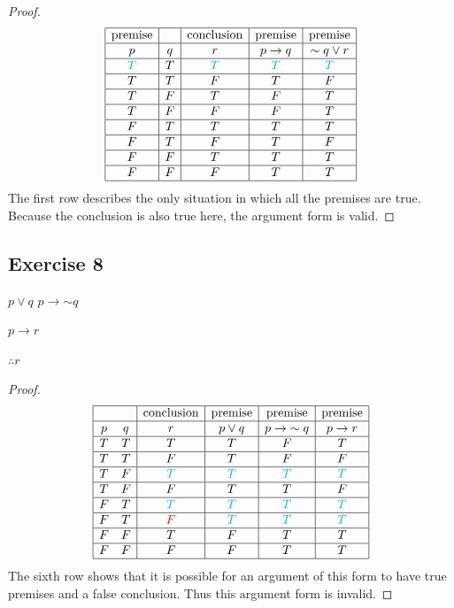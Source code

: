 \documentclass[14pt]{extarticle}
\begin{document}
\begin{proof} $$ \begin{array}{|c|c|c|c|c|} \hline \text{premise} & &
\text{conclusion} & \text{premise} & \text{premise} \\ \hline p & q & r & p \to
q & {\sim q} \vee r \\ \hline \color{cyan} T & T & \color{cyan} T & \color{cyan}
T & \color{cyan} T \\ \hline T & T & F & T & F \\ \hline T & F & T & F & T \\
\hline T & F & F & F & T \\ \hline F & T & T & T & T \\ \hline F & T & F & T & F
\\ \hline F & F & T & T & T \\ \hline F & F & F & T & T \\ \hline \end{array} $$
The first row describes the only situation in which all the premises are true.
Because the conclusion is also true here, the argument form is valid.
\end{proof}

\subsection{Exercise 8} $p \vee q$
$p \to {\sim q}$

$p \to r$

$\therefore r$

\begin{proof} $$ \begin{array}{|cc|c|c|c|c|} \hline & & \text{conclusion} &
\text{premise} & \text{premise} & \text{premise} \\ \hline p & q & r & p \vee q
& p \to {\sim q} & p \to r \\ \hline T & T & T & T & F & T \\ \hline T & T & F &
T & F & F \\ \hline T & F & \color{cyan} T & \color{cyan} T & \color{cyan} T &
\color{cyan} T \\ \hline T & F & F & T & T & F \\ \hline F & T & \color{cyan} T
& \color{cyan} T & \color{cyan} T & \color{cyan} T \\ \hline F & T & \color{red}
F & \color{cyan} T & \color{cyan} T & \color{cyan} T \\ \hline F & F & T & F & T
& T \\ \hline F & F & F & F & T & T \\ \hline \end{array} $$ The sixth row shows
that it is possible for an argument of this form to have true premises and a
false conclusion. Thus this argument form is invalid. \end{proof}
\end{document}

